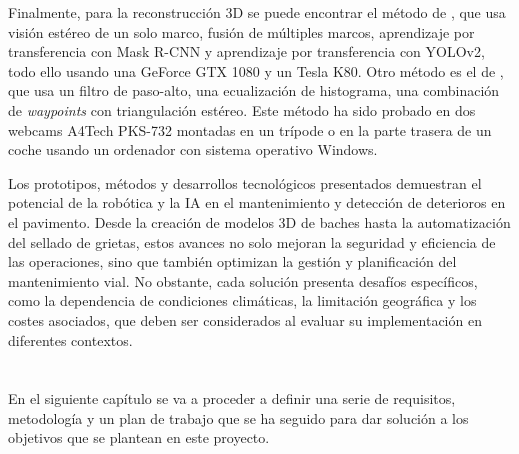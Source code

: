 Finalmente, para la reconstrucción 3D se puede encontrar el método de \cite{8788687}, que usa visión estéreo de un solo marco, fusión de múltiples marcos, aprendizaje por transferencia con Mask R-CNN y aprendizaje por transferencia con YOLOv2, todo ello usando una GeForce GTX 1080 y un Tesla K80. Otro método es el de \cite{8638822}, que usa un filtro de paso-alto, una ecualización de histograma, una combinación de \textit{waypoints} con triangulación estéreo. Este método ha sido probado en dos webcams A4Tech PKS-732 montadas en un trípode o en la parte trasera de un coche usando un ordenador con sistema operativo Windows.


Los prototipos, métodos y desarrollos tecnológicos presentados demuestran el potencial de la robótica y la \acs{IA} en el mantenimiento y detección de deterioros en el pavimento. Desde la creación de modelos 3D de baches hasta la automatización del sellado de grietas, estos avances no solo mejoran la seguridad y eficiencia de las operaciones, sino que también optimizan la gestión y planificación del mantenimiento vial. No obstante, cada solución presenta desafíos específicos, como la dependencia de condiciones climáticas, la limitación geográfica y los costes asociados, que deben ser considerados al evaluar su implementación en diferentes contextos.\\\\\\ %

En el siguiente capítulo se va a proceder a definir una serie de requisitos, metodología y un plan de trabajo que se ha seguido para dar solución a los objetivos que se plantean en este proyecto.